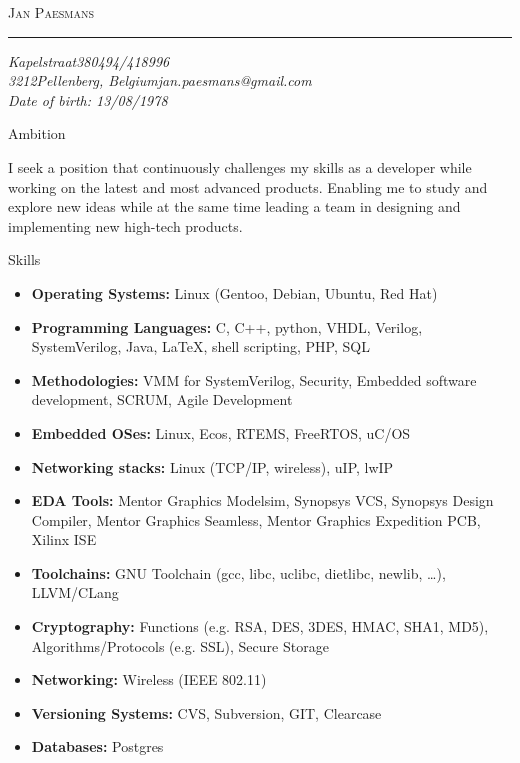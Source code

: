 \documentclass[12pt,oneside]{article}
\makeatletter
\newcommand{\name}{Jan Paesmans}
\newcommand{\street}{Kapelstraat}
\newcommand{\houseno}{38}
\newcommand{\postalcode}{3212}
\newcommand{\city}{Pellenberg}
\newcommand{\country}{Belgium}
\newcommand{\phone}{0494/418996}
\newcommand{\email}{jan.paesmans@gmail.com}
\newcommand{\birthday}{13/08/1978}
\newcommand{\bigname}[1]{
	\begin{center}\selectfont\Huge\scshape#1\end{center}
}
\newenvironment{ressection}[1]{
	\vspace{5pt}
	{\selectfont\Large#1}
	\begin{itemize}
	\vspace{5pt}
}{
	\end{itemize}
}
\newcommand{\ambition}[1]{
	\vspace{5pt}
	{\selectfont\Large Ambition}
	\vspace{5pt}
	\begin{flushleft} #1 \end{flushleft}
	\vspace{5pt}
}
\newcommand{\resitem}[1]{
	\vspace{-4pt}
	\item \begin{flushleft} #1 \end{flushleft}
}
\makeatother
\begin{document}
\fancyhf{}\renewcommand{\headrulewidth}{0pt}

 \selectfont

\bigname{\name}

\vspace{-8pt} \rule{\textwidth}{1pt}

\vspace{-1pt} {\itshape \street \houseno \hfill \phone} \\
\vspace{-1pt} {\itshape \postalcode \city, \country \hfill \email} \\
\vspace{-1pt} {\itshape \hfill Date of birth: \birthday} \\

\vspace{8pt}

\ambition{
I seek a position that continuously challenges my skills as a
developer while working on the latest and most advanced products. Enabling
me to study and explore new ideas while at the same time leading a team in 
designing and implementing new high-tech products.}

\begin{ressection}{Skills}
	\resitem{\textbf{Operating Systems:} Linux (Gentoo, Debian, Ubuntu, Red Hat)}
	\resitem{\textbf{Programming Languages:} C, C++, python, VHDL, Verilog, SystemVerilog, Java, \LaTeX, shell scripting, PHP, SQL}
	\resitem{\textbf{Methodologies:} VMM for SystemVerilog, Security, Embedded software development, SCRUM, Agile Development}
	\resitem{\textbf{Embedded OSes:} Linux, Ecos, RTEMS, FreeRTOS, uC/OS}
	\resitem{\textbf{Networking stacks:} Linux (TCP/IP, wireless), uIP, lwIP}
	\resitem{\textbf{EDA Tools:} Mentor Graphics Modelsim, Synopsys VCS, Synopsys Design Compiler, Mentor Graphics Seamless, Mentor Graphics Expedition PCB, Xilinx ISE}
	\resitem{\textbf{Toolchains:} GNU Toolchain (gcc, libc, uclibc, dietlibc, newlib, \dots), LLVM/CLang}
	\resitem{\textbf{Cryptography:} Functions (e.g. RSA, DES, 3DES, HMAC, SHA1, MD5), Algorithms/Protocols (e.g. SSL), Secure Storage}
	\resitem{\textbf{Networking:} Wireless (IEEE 802.11)}
	\resitem{\textbf{Versioning Systems:} CVS, Subversion, GIT, Clearcase}
	\resitem{\textbf{Databases:} Postgres}
\end{ressection}
\end{document}
